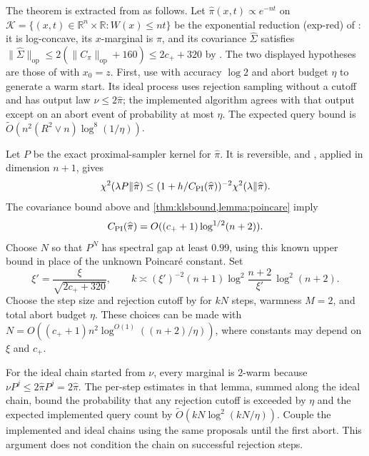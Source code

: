 \documentclass[11pt]{article}
\numberwithin{equation}{section}
\theoremstyle{definition}
\newcommand{\R}{\mathbb{R}}
\renewcommand{\O}{\widetilde{O}}
\newcommand{\op}{\mathrm{op}}
\begin{document}
The theorem is extracted from \cite{KV25} as follows.
Let $\widehat\pi(x,t)\propto e^{-nt}$ on
$\mathcal K=\{(x,t)\in\R^n\times\R: W(x)\leq nt\}$ be the exponential
reduction (exp-red) of \cite[Section~2.1]{KV25}: it is log-concave, its
$x$-marginal is
$\pi$, and its covariance
$\widehat\Sigma$ satisfies
$\|\widehat\Sigma\|_{\op}\leq2(\|C_\pi\|_{\op}+160)\leq2c_++320$ by
\cite[Lemma~2.5]{KV25}.
The two displayed hypotheses are those of \cite[Problems~2.1 and~3.1]{KV25}
with
$x_0=z$.
First, use \cite[Theorem~3.16]{KV25} with accuracy $\log2$ and abort budget
$\eta$ to generate a warm start. Its ideal process uses rejection sampling
without a cutoff and has output law $\nu\leq2\widehat\pi$; the implemented
algorithm agrees with that output except on an abort event of probability
at most $\eta$. The expected query bound is
$\O(n^2(R^2\vee n)\log^8(1/\eta))$.

Let $P$ be the exact proximal-sampler kernel for $\widehat\pi$.
It is reversible, and \cite[Lemma~2.9]{KV25}, applied in dimension $n+1$, gives
\[
 \chi^2(\lambda P\Vert\widehat\pi)
 \leq(1+h/C_{\rm PI}(\widehat\pi))^{-2}
       \chi^2(\lambda\Vert\widehat\pi).
\]
The covariance bound above and \cref{thm:klsbound,lemma:poincare} imply
\[
 C_{\rm PI}(\widehat\pi)
 =O((c_++1)\log^{1/2}(n+2)).
\]
Choose $N$ so that $P^N$ has spectral gap at least $0.99$, using this known
upper bound in place of the unknown Poincar\'e constant. Set
\[
 \xi'=\frac{\xi}{\sqrt{2c_++320}},\qquad
 k\asymp(\xi')^{-2}(n+1)
 \log^2\!\frac{n+2}{\xi'}\,\log^2(n+2).
\]
Choose the step size and rejection cutoff by \cite[Lemma~2.14]{KV25} for
$kN$ steps, warmness $M=2$, and total abort budget $\eta$.
These choices can be made with
$N=O((c_++1)n^2\log^{O(1)}((n+2)/\eta))$, where constants may depend on
$\xi$ and $c_+$.

For the ideal chain started from $\nu$, every marginal is $2$-warm because
$\nu P^j\leq2\widehat\pi P^j=2\widehat\pi$.
The per-step estimates in that lemma, summed along the ideal chain, bound
the probability that any rejection cutoff is exceeded by $\eta$ and the
expected implemented query count by $\O(kN\log^2(kN/\eta))$.
Couple the implemented and ideal chains using the same proposals until the
first abort. This argument does not condition the chain on successful
rejection steps.
\end{document}
